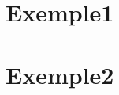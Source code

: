 \documentclass[12pt,twoside]{scrreprt}
\date{Avril 2016}
\author{Direction des opérations}
\begin{document}
% 

\tableofcontents

\chapter{Exemple1}

\chapter{Exemple2}
%

\clearpage
% 










\end{document}
